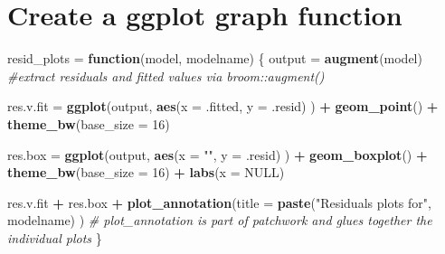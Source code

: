 \documentclass[]{article}
\newenvironment{Shaded}{\begin{snugshade}}{\end{snugshade}}
\newcommand{\KeywordTok}[1]{\textcolor[rgb]{0.13,0.29,0.53}{\textbf{#1}}}
\newcommand{\DataTypeTok}[1]{\textcolor[rgb]{0.13,0.29,0.53}{#1}}
\newcommand{\DecValTok}[1]{\textcolor[rgb]{0.00,0.00,0.81}{#1}}
\newcommand{\StringTok}[1]{\textcolor[rgb]{0.31,0.60,0.02}{#1}}
\newcommand{\CommentTok}[1]{\textcolor[rgb]{0.56,0.35,0.01}{\textit{#1}}}
\newcommand{\OtherTok}[1]{\textcolor[rgb]{0.56,0.35,0.01}{#1}}
\newcommand{\ControlFlowTok}[1]{\textcolor[rgb]{0.13,0.29,0.53}{\textbf{#1}}}
\newcommand{\OperatorTok}[1]{\textcolor[rgb]{0.81,0.36,0.00}{\textbf{#1}}}
\newcommand{\NormalTok}[1]{#1}
\begin{document}
\begin{Shaded}
\end{Shaded}

\section{Create a ggplot graph
function}\label{create-a-ggplot-graph-function}

\begin{Shaded}
\begin{Highlighting}[]
\NormalTok{resid_plots =}\StringTok{ }\ControlFlowTok{function}\NormalTok{(model, modelname) \{}
\NormalTok{     output =}\StringTok{ }\KeywordTok{augment}\NormalTok{(model) }\CommentTok{#extract residuals and fitted values via broom::augment()}
     
\NormalTok{     res.v.fit =}\StringTok{ }\KeywordTok{ggplot}\NormalTok{(output, }\KeywordTok{aes}\NormalTok{(}\DataTypeTok{x =}\NormalTok{ .fitted, }\DataTypeTok{y =}\NormalTok{ .resid) ) }\OperatorTok{+}
\StringTok{          }\KeywordTok{geom_point}\NormalTok{() }\OperatorTok{+}
\StringTok{          }\KeywordTok{theme_bw}\NormalTok{(}\DataTypeTok{base_size =} \DecValTok{16}\NormalTok{)}
     
\NormalTok{     res.box =}\StringTok{ }\KeywordTok{ggplot}\NormalTok{(output, }\KeywordTok{aes}\NormalTok{(}\DataTypeTok{x =} \StringTok{""}\NormalTok{, }\DataTypeTok{y =}\NormalTok{ .resid) ) }\OperatorTok{+}
\StringTok{          }\KeywordTok{geom_boxplot}\NormalTok{() }\OperatorTok{+}
\StringTok{          }\KeywordTok{theme_bw}\NormalTok{(}\DataTypeTok{base_size =} \DecValTok{16}\NormalTok{) }\OperatorTok{+}
\StringTok{          }\KeywordTok{labs}\NormalTok{(}\DataTypeTok{x =} \OtherTok{NULL}\NormalTok{)}
     
\NormalTok{     res.v.fit }\OperatorTok{+}\StringTok{ }\NormalTok{res.box }\OperatorTok{+}
\StringTok{          }\KeywordTok{plot_annotation}\NormalTok{(}\DataTypeTok{title =} \KeywordTok{paste}\NormalTok{(}\StringTok{"Residuals plots for"}\NormalTok{, modelname) ) }
\CommentTok{# plot_annotation is part of patchwork and glues together the individual plots}
\NormalTok{\}}
\end{Highlighting}
\end{Shaded}
\end{document}
